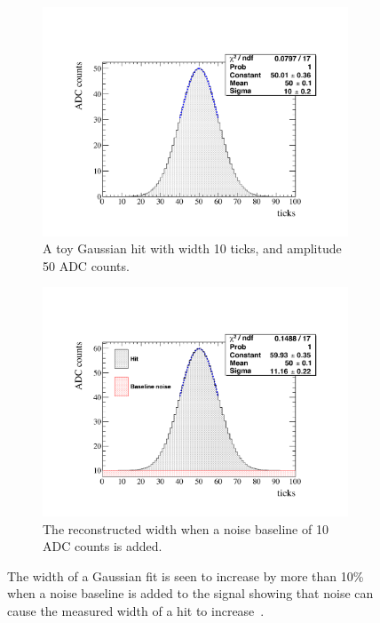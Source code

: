\begin{figure}[h!]
  \centering
  \begin{subfigure}{0.45\textwidth}
    \centering
    \includegraphics[width=\textwidth]{ToyGauss_Raw}
    \caption{A toy Gaussian hit with width 10 ticks, and amplitude 50 ADC counts.}
  \end{subfigure}
  \hspace{0.08\textwidth}
  \begin{subfigure}{0.45\textwidth}
    \centering
    \includegraphics[width=\textwidth]{ToyGauss_Noise}
    \caption{The reconstructed width when a noise baseline of 10 ADC counts is added.}
  \end{subfigure}
  \caption[The effect of adding a noise baseline to a hit]
          {The width of a Gaussian fit is seen to increase by more than 10\% when a noise baseline is added to the signal showing that noise can cause the measured width of a hit to increase~\citep{DomSeptMeeting}.}
          \label{fig:DomsHitModel}
\end{figure}  

